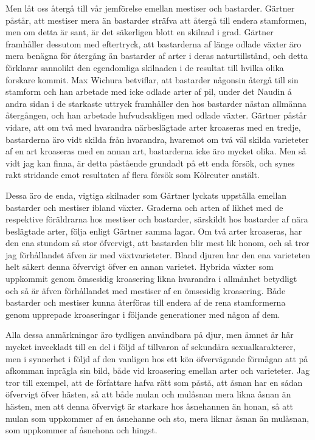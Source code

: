 Men låt oss återgå till vår jemförelse emellan mestiser och bastarder. Gärtner påstår, att mestiser mera än bastarder sträfva att återgå till endera stamformen, men om detta är sant, är det säkerligen blott en skilnad i grad. Gärtner framhåller dessutom med eftertryck, att bastarderna af länge odlade växter äro mera benägna för återgång än bastarder af arter i deras naturtillstånd, och detta förklarar sannolikt den egendomliga skilnaden i de resultat till hvilka olika forskare kommit. Max Wichura betviflar, att bastarder någonsin återgå till sin stamform och han arbetade med icke odlade arter af pil, under det Naudin å andra sidan i de starkaste uttryck framhåller den hos bastarder nästan allmänna återgången, och han arbetade hufvudsakligen med odlade växter. Gärtner påstår vidare, att om två med hvarandra närbeslägtade arter kroaseras med en tredje, bastarderna äro vidt skilda från hvarandra, hvaremot om två väl skilda varieteter af en art kroaseras med en annan art, bastarderna icke äro mycket olika. Men så vidt jag kan finna, är detta påstående grundadt på ett enda försök, och synes rakt stridande emot resultaten af flera försök som Kölreuter anstält.

Dessa äro de enda, vigtiga skilnader som Gärtner lyckats uppställa emellan bastarder och mestiser ibland växter. Graderna och arten af likhet med de respektive föräldrarna hos mestiser och bastarder, särskildt hos bastarder af nära beslägtade arter, följa enligt Gärtner samma lagar. Om två arter kroaseras, har den ena stundom så stor öfvervigt, att bastarden blir mest lik honom, och så tror jag förhållandet äfven är med växtvarieteter. Bland djuren har den ena varieteten helt säkert denna öfvervigt öfver en annan varietet. Hybrida växter som uppkommit genom ömsesidig kroasering likna hvarandra i allmänhet betydligt och så är äfven förhållandet med mestiser af en ömsesidig kroasering. Både bastarder och mestiser kunna återföras till endera af de rena stamformerna genom upprepade kroaseringar i följande generationer med någon af dem.

Alla dessa anmärkningar äro tydligen användbara på djur, men ämnet är här mycket inveckladt till en del i följd af tillvaron af sekundära sexualkarakterer, men i synnerhet i följd af den vanligen hos ett kön öfvervägande förmågan att på afkomman inprägla sin bild, både vid kroasering emellan arter och varieteter. Jag tror till exempel, att de författare hafva rätt som påstå, att åsnan har en sådan öfvervigt öfver hästen, så att både mulan och mulåsnan mera likna åsnan än hästen, men att denna öfvervigt är starkare hos åsnehannen än honan, så att mulan som uppkommer af en åsnehanne och sto, mera liknar åsnan än mulåsnan, som uppkommer af åsnehona och hingst.


